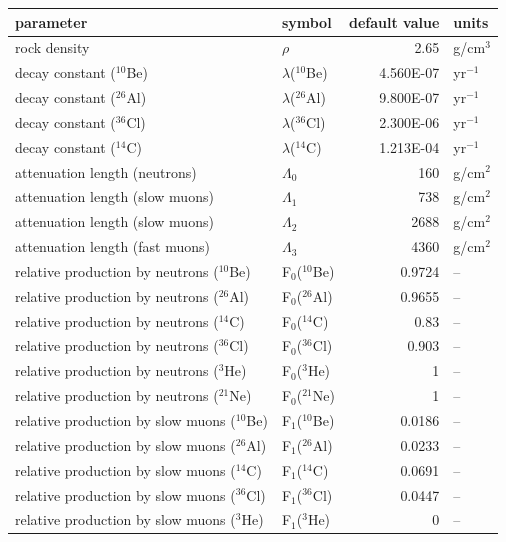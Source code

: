 \documentclass{article}
\begin{document}
\begin{table}[here]
  \centering
\begin{tabular}{llrl}
parameter &     symbol & default value &      units \\
\hline
rock density &    $\rho$ &       2.65 &  g/cm$^3$ \\
decay constant ($^{10}$Be) & $\lambda$($^{10}$Be) &  4.560E-07 & yr$^{-1}$ \\
decay constant ($^{26}$Al) & $\lambda$($^{26}$Al) &  9.800E-07 & yr$^{-1}$ \\
decay constant ($^{36}$Cl) & $\lambda$($^{36}$Cl) &  2.300E-06 & yr$^{-1}$ \\
decay constant ($^{14}$C) & $\lambda$($^{14}$C) &  1.213E-04 & yr$^{-1}$ \\
attenuation length (neutrons) & $\Lambda_0$ &        160 &  g/cm$^2$ \\
attenuation length (slow muons) & $\Lambda_1$ &        738 &  g/cm$^2$ \\
attenuation length (slow muons) & $\Lambda_2$ &       2688 &  g/cm$^2$ \\
attenuation length (fast muons) & $\Lambda_3$ &       4360 &  g/cm$^2$ \\
relative production by neutrons ($^{10}$Be) & F$_0$($^{10}$Be) &  0.9724 & -- \\
relative production by neutrons ($^{26}$Al) & F$_0$($^{26}$Al) &  0.9655 & -- \\
relative production by neutrons ($^{14}$C) & F$_0$($^{14}$C) &    0.83 & -- \\
relative production by neutrons ($^{36}$Cl) & F$_0$($^{36}$Cl) &  0.903 & -- \\
relative production by neutrons ($^{3}$He) & F$_0$($^{3}$He) &    1 & -- \\
relative production by neutrons ($^{21}$Ne) & F$_0$($^{21}$Ne) &  1 & -- \\
relative production by slow muons ($^{10}$Be) & F$_1$($^{10}$Be) & 0.0186 & -- \\
relative production by slow muons ($^{26}$Al) & F$_1$($^{26}$Al) & 0.0233 & -- \\
relative production by slow muons ($^{14}$C) & F$_1$($^{14}$C) &   0.0691 & -- \\
relative production by slow muons ($^{36}$Cl) & F$_1$($^{36}$Cl) & 0.0447 & -- \\
relative production by slow muons ($^{3}$He) & F$_1$($^{3}$He) &   0 & -- \\

\end{tabular}
\end{table}
\end{document}
